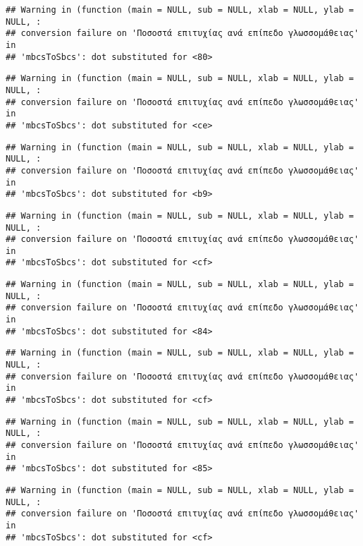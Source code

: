 \documentclass[
]{article}
\begin{document}
\begin{verbatim}
## Warning in (function (main = NULL, sub = NULL, xlab = NULL, ylab = NULL, :
## conversion failure on 'Ποσοστά επιτυχίας ανά επίπεδο γλωσσομάθειας' in
## 'mbcsToSbcs': dot substituted for <80>
\end{verbatim}

\begin{verbatim}
## Warning in (function (main = NULL, sub = NULL, xlab = NULL, ylab = NULL, :
## conversion failure on 'Ποσοστά επιτυχίας ανά επίπεδο γλωσσομάθειας' in
## 'mbcsToSbcs': dot substituted for <ce>
\end{verbatim}

\begin{verbatim}
## Warning in (function (main = NULL, sub = NULL, xlab = NULL, ylab = NULL, :
## conversion failure on 'Ποσοστά επιτυχίας ανά επίπεδο γλωσσομάθειας' in
## 'mbcsToSbcs': dot substituted for <b9>
\end{verbatim}

\begin{verbatim}
## Warning in (function (main = NULL, sub = NULL, xlab = NULL, ylab = NULL, :
## conversion failure on 'Ποσοστά επιτυχίας ανά επίπεδο γλωσσομάθειας' in
## 'mbcsToSbcs': dot substituted for <cf>
\end{verbatim}

\begin{verbatim}
## Warning in (function (main = NULL, sub = NULL, xlab = NULL, ylab = NULL, :
## conversion failure on 'Ποσοστά επιτυχίας ανά επίπεδο γλωσσομάθειας' in
## 'mbcsToSbcs': dot substituted for <84>
\end{verbatim}

\begin{verbatim}
## Warning in (function (main = NULL, sub = NULL, xlab = NULL, ylab = NULL, :
## conversion failure on 'Ποσοστά επιτυχίας ανά επίπεδο γλωσσομάθειας' in
## 'mbcsToSbcs': dot substituted for <cf>
\end{verbatim}

\begin{verbatim}
## Warning in (function (main = NULL, sub = NULL, xlab = NULL, ylab = NULL, :
## conversion failure on 'Ποσοστά επιτυχίας ανά επίπεδο γλωσσομάθειας' in
## 'mbcsToSbcs': dot substituted for <85>
\end{verbatim}

\begin{verbatim}
## Warning in (function (main = NULL, sub = NULL, xlab = NULL, ylab = NULL, :
## conversion failure on 'Ποσοστά επιτυχίας ανά επίπεδο γλωσσομάθειας' in
## 'mbcsToSbcs': dot substituted for <cf>
\end{verbatim}
\end{document}
